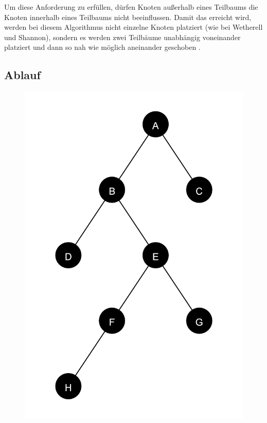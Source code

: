 Um diese Anforderung zu erfüllen, dürfen Knoten außerhalb eines Teilbaums die Knoten innerhalb eines Teilbaums nicht beeinflussen. 
Damit das erreicht wird, werden bei diesem Algorithmus nicht einzelne Knoten platziert (wie bei Wetherell und Shannon), 
sondern es werden zwei Teilbäume unabhängig voneinander platziert und dann so nah wie möglich aneinander geschoben \cite[]{q2}. 

\label{chap:kapitel3_3_Ablauf}
\subsection{Ablauf}

\begin{figure}[ht]
    \centering
    \begin{minipage}[]{0.3\linewidth}
        \centering
        \includegraphics[scale=0.07]{abbildungen/tree_beispiel_LL_LR_RL_RR}

\end{minipage}
\end{figure}
